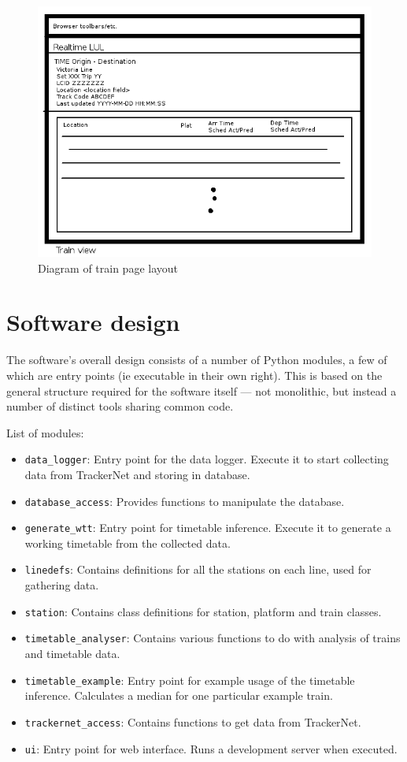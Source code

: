 \documentclass[a4paper,12pt]{report}
\begin{document}
\begin{figure}[h]
  \centering
  \includegraphics[width=\linewidth]{screen3}
  \caption{Diagram of train page layout}
  \label{fig:screen3}
\end{figure}

\section{Software design}

The software's overall design consists of a number of Python modules, a few of
which are entry points (ie executable in their own right). This is based on the
general structure required for the software itself --- not monolithic, but
instead a number of distinct tools sharing common code.

List of modules:
\begin{itemize}
  \item \texttt{data\_logger}: Entry point for the data logger. Execute it to
    start collecting data from TrackerNet and storing in database.
  \item \texttt{database\_access}: Provides functions to manipulate the
    database.
  \item \texttt{generate\_wtt}: Entry point for timetable inference. Execute it
    to generate a working timetable from the collected data.
  \item \texttt{linedefs}: Contains definitions for all the stations on each
    line, used for gathering data.
  \item \texttt{station}: Contains class definitions for station, platform and
    train classes.
  \item \texttt{timetable\_analyser}: Contains various functions to do with
    analysis of trains and timetable data.
  \item \texttt{timetable\_example}: Entry point for example usage of the
    timetable inference. Calculates a median for one particular example train.
  \item \texttt{trackernet\_access}: Contains functions to get data from
    TrackerNet.
  \item \texttt{ui}: Entry point for web interface. Runs a development server
    when executed.
\end{itemize}
\end{document}
